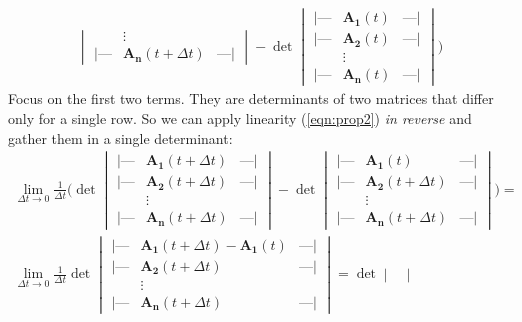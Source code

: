 \documentclass[../template.tex]{subfiles}
\begin{document}
\begin{expl}
\begin{align}
{\begin{vmatrix}
            & \vdots & \\
            \text{|---} & \bm{A_n}(t + \Delta t) & \text{---|} 
        \end{vmatrix}} - \operatorname{det} \begin{vmatrix}
            \text{|---} & \bm{A_1}(t) & \text{---|} \\
            \text{|---} & \bm{A_2}(t) & \text{---|} \\
            & \vdots & \\
            \text{|---} & \bm{A_n}(t) & \text{---|} 
        \end{vmatrix} \Bigg) \label{eqn:sk1}
    \end{align}
    Focus on the first two terms. They are determinants of two matrices that differ only for a single row. So we can apply linearity (\ref{eqn:prop2}) \textit{in reverse} and gather them in a single determinant:
    \begin{align*}
        \lim_{\Delta t \to 0} \frac{1}{\Delta t} \Bigg(
            \operatorname{det} \begin{vmatrix}
                \text{|---} & \bm{A_1}(t + \Delta t) & \text{---|} \\
                \text{|---} & \bm{A_2}(t + \Delta t) & \text{---|} \\
                & \vdots & \\
                \text{|---} & \bm{A_n}(t + \Delta t) & \text{---|} 
            \end{vmatrix} - \operatorname{det} \begin{vmatrix}
                \text{|---} & \bm{A_1}(t) & \text{---|} \\
                \text{|---} & \bm{A_2}(t + \Delta t) & \text{---|} \\
                & \vdots & \\
                \text{|---} & \bm{A_n}(t + \Delta t) & \text{---|} 
            \end{vmatrix}  
        \Bigg) =\\
        \lim_{\Delta t \to 0} \frac{1}{\Delta t} \operatorname{det}
        \begin{vmatrix}
            \text{|---} & \bm{A_1}(t+ \Delta t) - \bm{A_1}(t) & \text{---|} \\
            \text{|---} & \bm{A_2}(t + \Delta t) & \text{---|} \\
            & \vdots & \\
            \text{|---} & \bm{A_n}(t + \Delta t) & \text{---|} 
        \end{vmatrix}  = \operatorname{det}  \begin{vmatrix}

\end{vmatrix}
\end{align*}
\end{expl}
\end{document}
